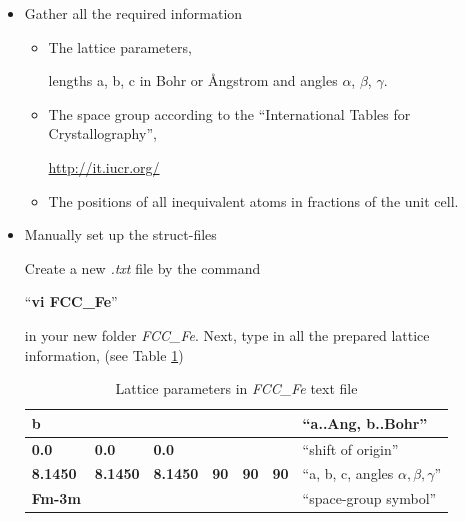 \documentclass[12 pt]{article}
\begin{document}
	  \begin{itemize}[leftmargin=0.2in]

	    \item Gather all the required information

	    \begin{itemize}

	      \item The lattice parameters,

  lengths a, b, c in Bohr or \AA{ngstrom} and angles $\alpha$, $\beta$, $\gamma$.

	      \item The space group according to the ``International Tables for Crystallography'', 
  
  \url{http://it.iucr.org/}

	      \item The positions of all inequivalent atoms in fractions of the unit cell. 

	    \end{itemize}

  \cleardoublepage

	    \item Manually set up the struct-files

  Create a new \emph{.txt} file by the command 

  ``\textbf{vi FCC\_Fe}'' 

  in your new folder \emph{FCC\_Fe}. Next, type in all the prepared lattice information, (see Table 
\ref{Lattice parameters in FCC_Fe text file})

  \begin{table}[ht]
    \centering
    \caption{Lattice parameters in \emph{FCC\_Fe} text file}
    \label{Lattice parameters in FCC_Fe text file}
    \vspace{2ex}
  \begin{tabular}{|l|l|l|l|l|l|l|}

  \hline
  \textbf{b}		&			&			&	&	& 		& ``a..Ang, 
b..Bohr''\\ \hline

  \textbf{0.0} 		& \textbf{0.0} 		& \textbf{0.0}		&	&	& 		& ``shift of 
origin''\\ \hline

  \textbf{8.1450} 	& \textbf{8.1450} 	& \textbf{8.1450} 	& \textbf{90} 	& \textbf{90} 	& \textbf{90}
	& ``a, b, c, angles $\alpha, \beta, \gamma$''\\ \hline

  \textbf{Fm-3m}	&			&			&	&	&		& 
``space-group symbol''\\ \hline


\end{tabular}
\end{table}
\end{itemize}
\end{document}

